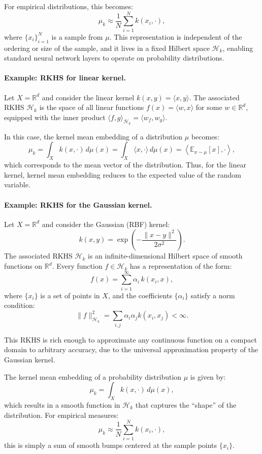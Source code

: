 \documentclass[twoside,11pt]{article}
\begin{document}
For empirical distributions, this becomes:
\begin{equation}
\mu_k \approx \frac{1}{N} \sum_{i=1}^N k(x_i, \cdot),
\end{equation}
where $\{x_i\}_{i=1}^N$ is a sample from $\mu$. This representation is independent of the ordering or size of the sample, and it lives in a fixed Hilbert space $\mathcal{H}_k$, enabling standard neural network layers to operate on probability distributions.



\paragraph{Example: RKHS for linear kernel.}
Let $X = \mathbb{R}^d$ and consider the linear kernel $k(x, y) = \langle x, y \rangle$. The associated RKHS $\mathcal{H}_k$ is the space of all linear functions $f(x) = \langle w, x \rangle$ for some $w \in \mathbb{R}^d$, equipped with the inner product $\langle f, g \rangle_{\mathcal{H}_k} = \langle w_f, w_g \rangle$.

In this case, the kernel mean embedding of a distribution $\mu$ becomes:
\[
\mu_k = \int_X k(x, \cdot) \, d\mu(x) = \int_X \langle x, \cdot \rangle \, d\mu(x) = \left\langle \mathbb{E}_{x \sim \mu}[x], \cdot \right\rangle,
\]
which corresponds to the mean vector of the distribution. Thus, for the linear kernel, kernel mean embedding reduces to the expected value of the random variable.

\paragraph{Example: RKHS for the Gaussian kernel.}
Let $X = \mathbb{R}^d$ and consider the Gaussian (RBF) kernel:
\[
k(x, y) = \exp\left(-\frac{\|x - y\|^2}{2\sigma^2}\right).
\]
The associated RKHS $\mathcal{H}_k$ is an infinite-dimensional Hilbert space of smooth functions on $\mathbb{R}^d$. Every function $f \in \mathcal{H}_k$ has a representation of the form:
\[
f(x) = \sum_{i=1}^\infty \alpha_i \, k(x_i, x),
\]
where $\{x_i\}$ is a set of points in $X$, and the coefficients $\{\alpha_i\}$ satisfy a norm condition:
\[
\|f\|_{\mathcal{H}_k}^2 = \sum_{i,j} \alpha_i \alpha_j k(x_i, x_j) < \infty.
\]

This RKHS is rich enough to approximate any continuous function on a compact domain to arbitrary accuracy, due to the universal approximation property of the Gaussian kernel.

The kernel mean embedding of a probability distribution $\mu$ is given by:
\[
\mu_k = \int_X k(x, \cdot) \, d\mu(x),
\]
which results in a smooth function in $\mathcal{H}_k$ that captures the ``shape'' of the distribution. For empirical measures:
\[
\mu_k \approx \frac{1}{N} \sum_{i=1}^N k(x_i, \cdot),
\]
this is simply a sum of smooth bumps centered at the sample points $\{x_i\}$.
\end{document}
